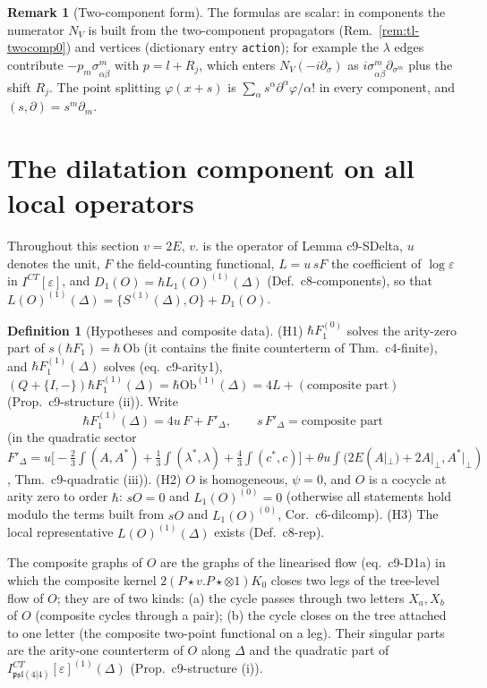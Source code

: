 \documentclass[11pt]{article}
\numberwithin{equation}{section}
\theoremstyle{plain}
\theoremstyle{definition}
\newtheorem{definition}[theorem]{Definition}
\newtheorem{remark}[theorem]{Remark}
\begin{document}
\begin{remark}[Two-component form]
The formulas are scalar: in components the numerator $N_V$ is built from the two-component propagators (Rem.~\ref{rem:tl-twocomp0}) and vertices (dictionary entry \texttt{action}); for example the $\lambda$ edges contribute $-p_m\sigma^m_{\alpha\dot\beta}$ with $p=l+R_j$, which enters $N_V(-i\partial_\sigma)$ as $i\sigma^m_{\alpha\dot\beta}\partial_{\sigma^m}$ plus the shift $R_j$. The point splitting $\varphi(x+s)$ is $\sum_\alpha s^\alpha\partial^\alpha\varphi/\alpha!$ in every component, and $(s,\partial)=s^m\partial_m$.
\end{remark}


\section{The dilatation component on all local operators}
\label{sec:tl-D1}

Throughout this section $v=2E$, $v.$ is the operator of Lemma c9-SDelta, $u$ denotes the unit, $F$ the field-counting functional, $L=u\,sF$ the coefficient of $\log\varepsilon$ in $I^{CT}[\varepsilon]$, and $D_1(O)=\hbar L_1(O)^{(1)}(\Delta)$ (Def.~c8-components), so that $L(O)^{(1)}(\Delta)=\{S^{(1)}(\Delta),O\}+D_1(O)$.

\begin{definition}[Hypotheses and composite data]
\label{def:tl-H}
(H1) $\hbar F_1^{(0)}$ solves the arity-zero part of $s(\hbar F_1)=\hbar\,\mathrm{Ob}$ (it contains the finite counterterm of Thm.~c4-finite), and $\hbar F_1^{(1)}(\Delta)$ solves (eq.~c9-arity1), $(Q+\{I,-\})\hbar F_1^{(1)}(\Delta)=\hbar\mathrm{Ob}^{(1)}(\Delta)=4L+(\text{composite part})$ (Prop.~c9-structure (ii)). Write
\[
\hbar F_1^{(1)}(\Delta)=4u\,F+F'_\Delta,\qquad s\,F'_\Delta=\text{composite part}
\]
(in the quadratic sector $F'_\Delta=u\big[-\tfrac23\int(A,A^*)+\tfrac13\int(\lambda^*,\lambda)+\tfrac43\int(c^*,c)\big]+\theta u\int(2E(A|_\perp)+2A|_\perp,A^*|_\perp)$, Thm.~c9-quadratic (iii)).
(H2) $O$ is homogeneous, $\psi=0$, and $O$ is a cocycle at arity zero to order $\hbar$: $sO=0$ and $L_1(O)^{(0)}=0$ (otherwise all statements hold modulo the terms built from $sO$ and $L_1(O)^{(0)}$, Cor.~c6-dilcomp).
(H3) The local representative $L(O)^{(1)}(\Delta)$ exists (Def.~c8-rep).

The composite graphs of $O$ are the graphs of the linearised flow (eq.~c9-D1a) in which the composite kernel $2(P\star v.P\star\otimes1)K_0$ closes two legs of the tree-level flow of $O$; they are of two kinds: (a) the cycle passes through two letters $X_a,X_b$ of $O$ (composite cycles through a pair); (b) the cycle closes on the tree attached to one letter (the composite two-point functional on a leg). Their singular parts are the arity-one counterterm of $O$ along $\Delta$ and the quadratic part of $I^{CT}_{\mathfrak{psl}(4|4)}[\varepsilon]^{(1)}(\Delta)$ (Prop.~c9-structure (i)).
\end{definition}
\end{document}
